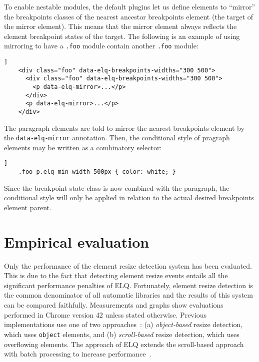 \documentclass[sigconf,9pt]{acmart}
\newcommand{\elq}{ELQ}
\newcommand{\code}[1]{\texttt{#1}}
\begin{document}
  To enable nestable modules, the default plugins let us define elements to ``mirror'' the breakpoints classes of the nearest ancestor breakpoints element (the target of the mirror element).
  This means that the mirror element always reflects the element breakpoint states of the target.
  The following is an example of using mirroring to have a \code{.foo} module contain another \code{.foo} module:
  \begin{lstlisting}[gobble=4,caption={},captionpos=b,label={}]]
    <div class="foo" data-elq-breakpoints-widths="300 500">
      <div class="foo" data-elq-breakpoints-widths="300 500">
        <p data-elq-mirror>...</p>
      </div>
      <p data-elq-mirror>...</p>
    </div>
  \end{lstlisting}
  The paragraph elements are told to mirror the nearest breakpoints element by the \code{data-elq-mirror} annotation.
  Then, the conditional style of pragraph elements may be written as a combinatory selector:
  \begin{lstlisting}[gobble=4,caption={},captionpos=b,label={code:elq-mirror-example-css}]]
    .foo p.elq-min-width-500px { color: white; }
  \end{lstlisting}
  Since the breakpoint state class is now combined with the paragraph, the conditional style will only be applied in relation to the actual desired breakpoints element parent.

  \section{Empirical evaluation}\label{sec:eval}
    Only the performance of the element resize detection system has
    been evaluated.  This is due to the fact that detecting element
    resize events entails all the significant performance penalties of
    \elq{}.  Fortunately, element resize detection is the common
    denominator of all automatic libraries and the results of this
    system can be compared faithfully.  Measurements and graphs show
    evaluations performed in Chrome version 42 unless stated
    otherwise.  Previous implementations use one of two
    approaches~\cite{backalley}: (a) {\em object-based} resize
    detection, which uses \verb|object| elements, and (b) {\em
      scroll-based} resize detection, which uses overflowing elements.
    The approach of \elq{} extends the scroll-based approach with
    batch processing to increase performance~\cite{WienerEH15}.
\end{document}
